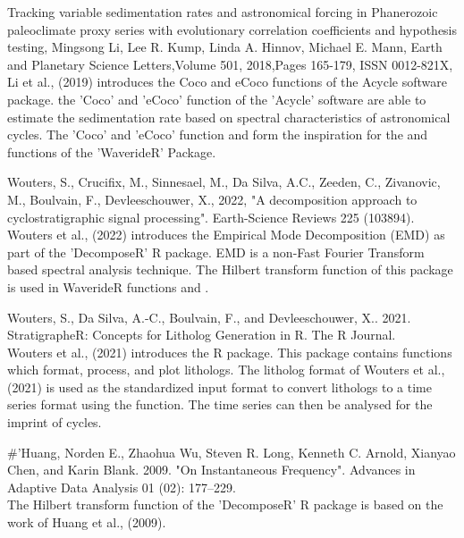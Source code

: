 \documentclass[a4paper]{book}
\begin{document}
\begin{References}
Tracking variable sedimentation rates and astronomical forcing in Phanerozoic
paleoclimate proxy series with evolutionary correlation coefficients and
hypothesis testing, Mingsong Li, Lee R. Kump, Linda A. Hinnov, Michael
E. Mann, Earth and Planetary Science Letters,Volume 501, 2018,Pages 165-179,
ISSN 0012-821X,  \\{}
Li et al., (2019) introduces the Coco and eCoco functions of the Acycle
software package. the 'Coco' and 'eCoco' function of the 'Acycle' software
are able to estimate the sedimentation rate based on spectral
characteristics of astronomical cycles. The 'Coco' and 'eCoco' function and
form the inspiration for the   and  
functions of the 'WaverideR' Package.


Wouters, S., Crucifix, M., Sinnesael, M., Da Silva, A.C., Zeeden, C.,
Zivanovic, M., Boulvain, F., Devleeschouwer, X., 2022,
"A decomposition approach to cyclostratigraphic signal processing".
Earth-Science Reviews 225 (103894). \\{}
Wouters et al., (2022) introduces the Empirical Mode Decomposition (EMD) as
part of the 'DecomposeR' R package. EMD is a non-Fast Fourier Transform
based spectral analysis technique. The Hilbert transform function
 of this package is used in WaverideR
functions  and .

Wouters, S., Da Silva, A.-C., Boulvain, F., and Devleeschouwer, X.. 2021.
StratigrapheR: Concepts for Litholog Generation in R. The R Journal.
 \\{}
Wouters et al., (2021) introduces the  R
package. This package contains functions which format, process, and plot lithologs.
The litholog format of Wouters et al., (2021) is used as the standardized input
format to convert lithologs to a time series format using the 
function. The time series can then be analysed for the imprint of cycles.

\#'Huang, Norden E., Zhaohua Wu, Steven R. Long, Kenneth C. Arnold, Xianyao Chen,
and Karin Blank. 2009. "On Instantaneous Frequency". Advances in Adaptive
Data Analysis 01 (02): 177–229.  \\{}
The Hilbert transform function  of the 'DecomposeR'
R package is based on the work of Huang et al., (2009).


\end{References}
\end{document}
